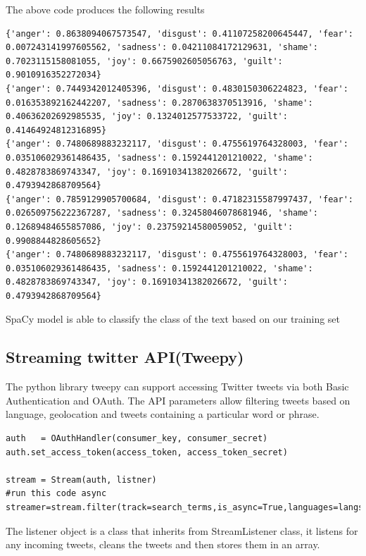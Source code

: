The above code produces the following results
\begin{lstlisting}
{'anger': 0.8638094067573547, 'disgust': 0.41107258200645447, 'fear': 0.007243141997605562, 'sadness': 0.04211084172129631, 'shame': 0.7023115158081055, 'joy': 0.6675902605056763, 'guilt': 0.9010916352272034}
{'anger': 0.7449342012405396, 'disgust': 0.4830150306224823, 'fear': 0.016353892162442207, 'sadness': 0.2870638370513916, 'shame': 0.40636202692985535, 'joy': 0.1324012577533722, 'guilt': 0.41464924812316895}
{'anger': 0.7480689883232117, 'disgust': 0.4755619764328003, 'fear': 0.035106029361486435, 'sadness': 0.1592441201210022, 'shame': 0.4828783869743347, 'joy': 0.16910341382026672, 'guilt': 0.4793942868709564}
{'anger': 0.7859129905700684, 'disgust': 0.47182315587997437, 'fear': 0.026509756222367287, 'sadness': 0.32458046078681946, 'shame': 0.12689484655857086, 'joy': 0.23759214580059052, 'guilt': 0.9908844828605652}
{'anger': 0.7480689883232117, 'disgust': 0.4755619764328003, 'fear': 0.035106029361486435, 'sadness': 0.1592441201210022, 'shame': 0.4828783869743347, 'joy': 0.16910341382026672, 'guilt': 0.4793942868709564}
\end{lstlisting}

SpaCy model is able to classify the class of the text based on our training set



\clearpage

\subsection{Streaming twitter API(Tweepy)}

The python library tweepy can support accessing Twitter tweets via both Basic Authentication and OAuth. The API parameters allow filtering tweets based on language, geolocation and tweets containing a particular word or phrase.

\begin{lstlisting}
auth   = OAuthHandler(consumer_key, consumer_secret)
auth.set_access_token(access_token, access_token_secret)

stream = Stream(auth, listner)
#run this code async 
streamer=stream.filter(track=search_terms,is_async=True,languages=langs,locations=loca_tions)
\end{lstlisting}

The listener object is a class that inherits from StreamListener class, it listens for any incoming tweets, cleans the tweets and then stores them in an array.

